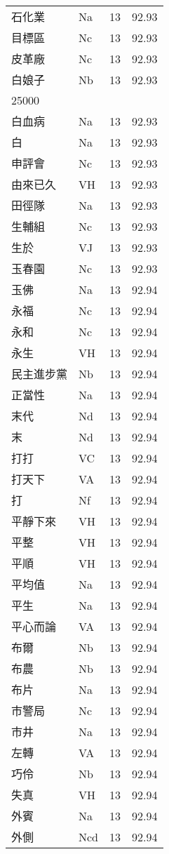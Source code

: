 \documentclass[twocolumn]{book}
\begin{document}
\begin{supertabular}{llrr}
石化業 & Na & 13 &  92.93\\
目標區 & Nc & 13 &  92.93\\
皮革廠 & Nc & 13 &  92.93\\
白娘子 & Nb & 13 &  92.93\\
25000\\
白血病 & Na & 13 &  92.93\\
白 & Na & 13 &  92.93\\
申評會 & Nc & 13 &  92.93\\
由來已久 & VH & 13 &  92.93\\
田徑隊 & Na & 13 &  92.93\\
生輔組 & Nc & 13 &  92.93\\
生於 & VJ & 13 &  92.93\\
玉春園 & Nc & 13 &  92.93\\
玉佛 & Na & 13 &  92.94\\
永福 & Nc & 13 &  92.94\\
永和 & Nc & 13 &  92.94\\
永生 & VH & 13 &  92.94\\
民主進步黨 & Nb & 13 &  92.94\\
正當性 & Na & 13 &  92.94\\
末代 & Nd & 13 &  92.94\\
末 & Nd & 13 &  92.94\\
打打 & VC & 13 &  92.94\\
打天下 & VA & 13 &  92.94\\
打 & Nf & 13 &  92.94\\
平靜下來 & VH & 13 &  92.94\\
平整 & VH & 13 &  92.94\\
平順 & VH & 13 &  92.94\\
平均值 & Na & 13 &  92.94\\
平生 & Na & 13 &  92.94\\
平心而論 & VA & 13 &  92.94\\
布爾 & Nb & 13 &  92.94\\
布農 & Nb & 13 &  92.94\\
布片 & Na & 13 &  92.94\\
市警局 & Nc & 13 &  92.94\\
市井 & Na & 13 &  92.94\\
左轉 & VA & 13 &  92.94\\
巧伶 & Nb & 13 &  92.94\\
失真 & VH & 13 &  92.94\\
外賓 & Na & 13 &  92.94\\
外側 & Ncd & 13 &  92.94\\

\end{supertabular}
\end{document}
